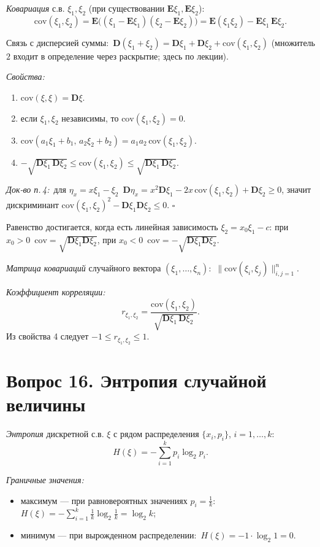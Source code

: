 \textit{Ковариация} с.в. $\xi_1,\xi_2$ (при существовании $\mathbf{E}\xi_1,\mathbf{E}\xi_2$):
\[ \mathrm{cov}(\xi_1,\xi_2)=\mathbf{E}\big((\xi_1-\mathbf{E}\xi_1)(\xi_2-\mathbf{E}\xi_2)\big)=\mathbf{E}(\xi_1\xi_2)-\mathbf{E}\xi_1\,\mathbf{E}\xi_2. \]

Связь с дисперсией суммы:\ $\mathbf{D}(\xi_1+\xi_2)=\mathbf{D}\xi_1+\mathbf{D}\xi_2+\mathrm{cov}(\xi_1,\xi_2)$ (множитель $2$ входит в определение через раскрытие; здесь по лекции).

\textit{Свойства:}
\begin{enumerate}
  \item $\mathrm{cov}(\xi,\xi)=\mathbf{D}\xi$.
  \item если $\xi_1,\xi_2$ независимы, то $\mathrm{cov}(\xi_1,\xi_2)=0$.
  \item $\mathrm{cov}(a_1\xi_1+b_1,\,a_2\xi_2+b_2)=a_1a_2\,\mathrm{cov}(\xi_1,\xi_2)$.
  \item $-\sqrt{\mathbf{D}\xi_1\,\mathbf{D}\xi_2}\le\mathrm{cov}(\xi_1,\xi_2)\le\sqrt{\mathbf{D}\xi_1\,\mathbf{D}\xi_2}$.
\end{enumerate}
\textit{Док-во п.\,4:}\ для $\eta_x=x\xi_1-\xi_2$\ $\mathbf{D}\eta_x=x^2\mathbf{D}\xi_1-2x\,\mathrm{cov}(\xi_1,\xi_2)+\mathbf{D}\xi_2\ge0$, значит дискриминант $\mathrm{cov}(\xi_1,\xi_2)^2-\mathbf{D}\xi_1\mathbf{D}\xi_2\le0$. \hfill$\square$

Равенство достигается, когда есть линейная зависимость $\xi_2=x_0\xi_1-c$: при $x_0>0$\ $\mathrm{cov}=\sqrt{\mathbf{D}\xi_1\mathbf{D}\xi_2}$, при $x_0<0$\ $\mathrm{cov}=-\sqrt{\mathbf{D}\xi_1\mathbf{D}\xi_2}$.

\textit{Матрица ковариаций} случайного вектора $(\xi_1,\dots,\xi_n)$:\ $\big\|\mathrm{cov}(\xi_i,\xi_j)\big\|_{i,j=1}^{n}$.

\textit{Коэффициент корреляции:}
\[ r_{\xi_1,\xi_2}=\frac{\mathrm{cov}(\xi_1,\xi_2)}{\sqrt{\mathbf{D}\xi_1\,\mathbf{D}\xi_2}}. \]
Из свойства 4 следует $-1\le r_{\xi_1,\xi_2}\le1$.

\section*{Вопрос 16. Энтропия случайной величины}

\textit{Энтропия} дискретной с.в. $\xi$ с рядом распределения $\{x_i,p_i\}$, $i=1,\dots,k$:
\[ H(\xi)=-\sum_{i=1}^{k}p_i\log_2 p_i. \]

\textit{Граничные значения:}
\begin{itemize}
  \item максимум — при равновероятных значениях $p_i=\tfrac1k$:\ $H(\xi)=-\sum_{i=1}^{k}\tfrac1k\log_2\tfrac1k=\log_2 k$;
  \item минимум — при вырожденном распределении:\ $H(\xi)=-1\cdot\log_2 1=0$.
\end{itemize}

